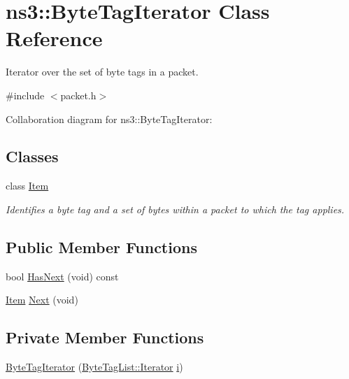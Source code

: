 \hypertarget{classns3_1_1ByteTagIterator}{}\section{ns3\+:\+:Byte\+Tag\+Iterator Class Reference}
\label{classns3_1_1ByteTagIterator}


Iterator over the set of byte tags in a packet.  




{\ttfamily \#include $<$packet.\+h$>$}



Collaboration diagram for ns3\+:\+:Byte\+Tag\+Iterator\+:
\subsection*{Classes}
\begin{DoxyCompactItemize}
\item 
class \hyperlink{classns3_1_1ByteTagIterator_1_1Item}{Item}
\begin{DoxyCompactList}\small\item\em Identifies a byte tag and a set of bytes within a packet to which the tag applies. \end{DoxyCompactList}\end{DoxyCompactItemize}
\subsection*{Public Member Functions}
\begin{DoxyCompactItemize}
\item 
bool \hyperlink{classns3_1_1ByteTagIterator_a1337834aa5fbb23a982fe521e54fb78a}{Has\+Next} (void) const 
\item 
\hyperlink{classns3_1_1ByteTagIterator_1_1Item}{Item} \hyperlink{classns3_1_1ByteTagIterator_af2fa25a08fe0a868ab051e3c4bfcad01}{Next} (void)
\end{DoxyCompactItemize}
\subsection*{Private Member Functions}
\begin{DoxyCompactItemize}
\item 
\hyperlink{classns3_1_1ByteTagIterator_a0543450785af2d4af586240dbd48166a}{Byte\+Tag\+Iterator} (\hyperlink{classns3_1_1ByteTagList_1_1Iterator}{Byte\+Tag\+List\+::\+Iterator} \hyperlink{lte__uplink__power__control_8m_a6f6ccfcf58b31cb6412107d9d5281426}{i})
\end{DoxyCompactItemize}
